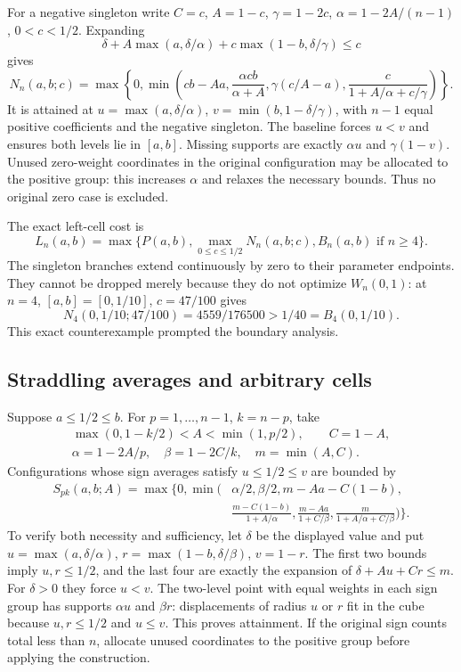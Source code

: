 For a negative singleton write $C=c$, $A=1-c$, $\gamma=1-2c$, $\alpha=1-2A/(n-1)$, $0<c<1/2$. Expanding
\[
\delta+A\max(a,\delta/\alpha)+c\max(1-b,\delta/\gamma)\le c
\]
gives
\begin{equation}\label{eq:allcell-negative}
N_n(a,b;c)=\max\left\{0,\min\left(
cb-Aa,\frac{\alpha cb}{\alpha+A},
\gamma(c/A-a),\frac{c}{1+A/\alpha+c/\gamma}\right)\right\}.
\end{equation}
It is attained at $u=\max(a,\delta/\alpha)$, $v=\min(b,1-\delta/\gamma)$, with $n-1$ equal positive coefficients and the negative singleton. The baseline forces $u<v$ and ensures both levels lie in $[a,b]$. Missing supports are exactly $\alpha u$ and $\gamma(1-v)$. Unused zero-weight coordinates in the original configuration may be allocated to the positive group: this increases $\alpha$ and relaxes the necessary bounds. Thus no original zero case is excluded.

The exact left-cell cost is
\begin{equation}\label{eq:left-cell}
L_n(a,b)=\max\{P(a,b),\max_{0\le c\le1/2}N_n(a,b;c),
                       B_n(a,b)\text{ if }n\ge4\}.
\end{equation}
The singleton branches extend continuously by zero to their parameter endpoints. They cannot be dropped merely because they do not optimize $W_n(0,1)$: at $n=4$, $[a,b]=[0,1/10]$, $c=47/100$ gives
\[
N_4(0,1/10;47/100)=4559/176500>1/40=B_4(0,1/10).
\]
This exact counterexample prompted the boundary analysis.

\subsection{Straddling averages and arbitrary cells}
Suppose $a\le1/2\le b$. For $p=1,\ldots,n-1$, $k=n-p$, take
\begin{gather*}
\max(0,1-k/2)<A<\min(1,p/2),\qquad C=1-A,\\
\alpha=1-2A/p,\quad\beta=1-2C/k,\quad m=\min(A,C).
\end{gather*}
Configurations whose sign averages satisfy $u\le1/2\le v$ are bounded by
\begin{equation}\label{eq:allcell-central}
\begin{split}
S_{pk}(a,b;A)=\max\{0,\min(&\alpha/2,\beta/2,m-Aa-C(1-b),\\
&\frac{m-C(1-b)}{1+A/\alpha},
\frac{m-Aa}{1+C/\beta},
\frac m{1+A/\alpha+C/\beta})\}.
\end{split}
\end{equation}
To verify both necessity and sufficiency, let $\delta$ be the displayed value and put
$u=\max(a,\delta/\alpha)$, $r=\max(1-b,\delta/\beta)$, $v=1-r$.
The first two bounds imply $u,r\le1/2$, and the last four are exactly the expansion of $\delta+Au+Cr\le m$. For $\delta>0$ they force $u<v$. The two-level point with equal weights in each sign group has supports $\alpha u$ and $\beta r$: displacements of radius $u$ or $r$ fit in the cube because $u,r\le1/2$ and $u\le v$. This proves attainment. If the original sign counts total less than $n$, allocate unused coordinates to the positive group before applying the construction.

